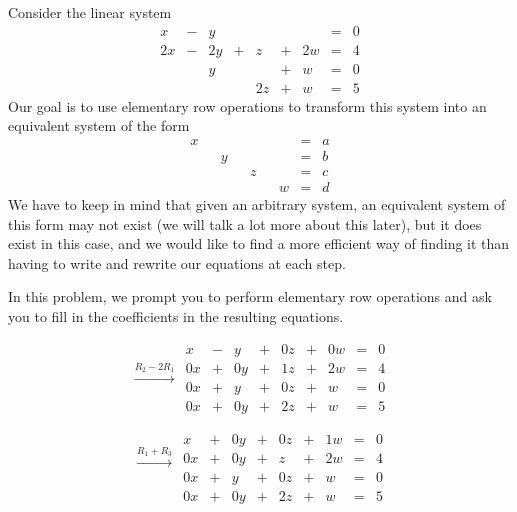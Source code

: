 \documentclass{ximera}
\begin{document}
\begin{exploration}\label{init:augmentedmatrixex}
Consider the linear system
\begin{equation}\label{eq:sys20originalsystem1}
\begin{array}{ccccccccc}
      x &- &y&&&&&= &0 \\
	 2x& -&2y&+&z&+&2w&=&4\\
     & &y&&&+&w&=&0\\
     & &&&2z&+&w&=&5
    \end{array}
    \end{equation}
Our goal is to use elementary row operations to transform this system into an equivalent system of the form
\begin{equation}\begin{array}{ccccccccc}
      x & &&&&&&= &a \\
	 & &y&&&&&=&b\\
     & &&&z&&&=&c\\
     & &&&&&w&=&d
    \end{array}
    \end{equation}
 We have to keep in mind that given an arbitrary system, an equivalent system of this form may not exist (we will talk a lot more about this later), but it does exist in this case, and we would like to find a more efficient way of finding it than having to write and rewrite our equations at each step.   
 
In this problem, we prompt you to perform elementary row operations and ask you to fill in the coefficients in the resulting equations.
 
$$\begin{array}{c}
 \\
 \xrightarrow{R_2-2R_1}\\
\\
\\
 \end{array}
\begin{matrix}
      x &- &y&+&0z&+&0w&= &0 \\
	 0x& +&0y&+& 1z&+& 2w&=& 4\\
     0x& +&y&+&0z&+&w&=&0\\
     0x&+&0y&+&2z&+&w&=&5
    \end{matrix}$$
    
 $$
 \begin{array}{c}
 \xrightarrow{R_1+R_3}\\
\\
\\
\\
 \end{array}
\begin{matrix}
      x &+ & 0y&+&0z&+& 1w&= & 0 \\
	 0x& +&0y&+&z&+&2w&=&4\\
     0x& +&y&+&0z&+&w&=&0\\
     0x&+&0y&+&2z&+&w&=&5
    \end{matrix}$$
 


\end{exploration}
\end{document}

